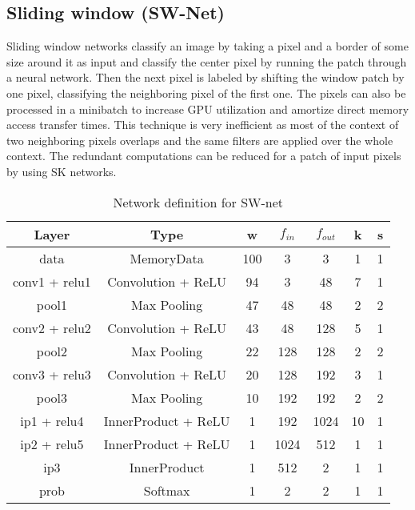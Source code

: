 \subsection{Sliding window (SW-Net)}

Sliding window networks classify an image by taking a pixel and a border of some size around it as input and classify the center pixel by running the patch through a neural network. Then the next pixel is labeled by shifting the window patch by one pixel, classifying the neighboring pixel of the first one. The pixels can also be processed in a minibatch to increase GPU utilization and amortize direct memory access transfer times. This technique is very inefficient as most of the context of two neighboring pixels overlaps and the same filters are applied over the whole context. The redundant computations can be reduced for a patch of input pixels by using SK networks.

\begin{table}
\begin{center}
  \begin{tabular}{ | c | c | c | c | c | c | c | }
    \hline
    Layer  &  Type  & w & $f_{in}$ & $f_{out}$ & k & s \\ \hline
   data & MemoryData & 100 & 3 & 3 & 1 & 1 \\ \hline 
   conv1 + relu1 & Convolution + ReLU & 94 & 3 & 48 & 7 & 1 \\ \hline
   pool1 & Max Pooling & 47 & 48 & 48 & 2 & 2 \\ \hline
   conv2 + relu2 & Convolution + ReLU & 43 & 48 & 128 & 5 & 1 \\ \hline
   pool2 & Max Pooling & 22 & 128 & 128 & 2 & 2 \\ \hline
   conv3 + relu3 & Convolution + ReLU & 20 & 128 & 192 & 3 & 1 \\ \hline
   pool3 & Max Pooling & 10 & 192 & 192 & 2 & 2 \\ \hline
   ip1 + relu4 & InnerProduct + ReLU & 1 & 192 & 1024 & 10 & 1 \\ \hline
   ip2 + relu5 & InnerProduct + ReLU & 1 & 1024 & 512 & 1 & 1 \\ \hline
   ip3  & InnerProduct & 1 & 512 & 2 & 1 & 1 \\ \hline
   prob & Softmax & 1 & 2 & 2 & 1 &1 \\ 
    \hline
  \end{tabular}
  \end{center}
  \caption{Network definition for SW-net}
  \label{table:def-sw-net}
  \end{table}

